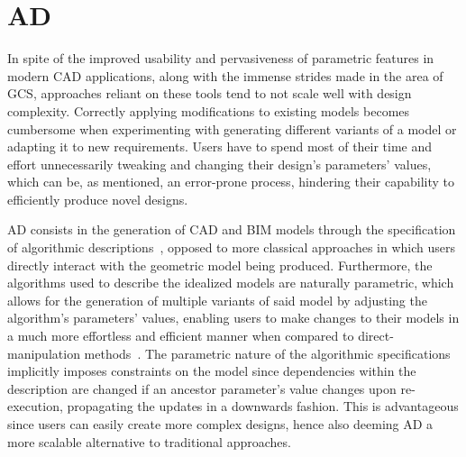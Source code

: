 \section{\acl{AD}}%
\label{sec:intro.ad}

In spite of the improved usability and pervasiveness of parametric features in
modern \ac{CAD} applications, along with the immense strides made in the area of
\ac{GCS}, approaches reliant on these tools tend to not scale well with design
complexity.  Correctly applying modifications to existing models becomes
cumbersome when experimenting with generating different variants of a model or
adapting it to new requirements.  Users have to spend most of their time and
effort unnecessarily tweaking and changing their design's parameters' values,
which can be, as mentioned, an error-prone process, hindering their capability
to efficiently produce novel designs.

\Ac{AD} consists in the generation of \ac{CAD} and \ac{BIM} models through the
specification of algorithmic descriptions~\cite{McCormack:2004:GDPDR}, opposed
to more classical approaches in which users directly interact with the geometric
model being produced.  Furthermore, the algorithms used to describe the
idealized models are naturally parametric, which allows for the generation of
multiple variants of said model by adjusting the algorithm's parameters' values,
enabling users to make changes to their models in a much more effortless and
efficient manner when compared to direct-manipulation
methods~\cite{Leitao:2013:PESLGD}.  The parametric nature of the algorithmic
specifications implicitly imposes constraints on the model since dependencies
within the description are changed if an ancestor parameter's value changes upon
re-execution, propagating the updates in a downwards fashion.  This is
advantageous since users can easily create more complex designs, hence also
deeming \ac{AD} a more scalable alternative to traditional approaches.

